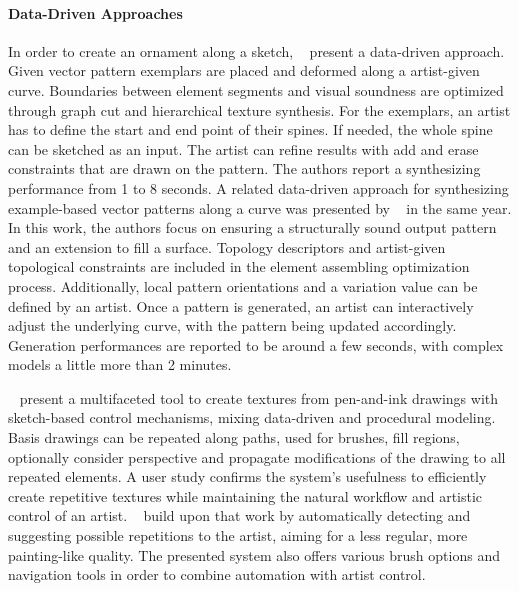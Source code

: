 
\paragraph{Data-Driven Approaches}

In order to create an ornament along a sketch, \citeauthor*{lu_2014_dds}~\cite{lu_2014_dds} present a data-driven approach. Given vector pattern exemplars are placed and deformed along a artist-given curve. Boundaries between element segments and visual soundness are optimized through graph cut and hierarchical texture synthesis. For the exemplars, an artist has to define the start and end point of their spines. If needed, the whole spine can be sketched as an input. The artist can refine results with add and erase constraints that are drawn on the pattern. The authors report a synthesizing performance from 1 to 8 seconds. A related data-driven approach for synthesizing example-based vector patterns along a curve was presented by \citeauthor*{zhou_2014_tsv}~\cite{zhou_2014_tsv} in the same year. In this work, the authors focus on ensuring a structurally sound output pattern and an extension to fill a surface. Topology descriptors and artist-given topological constraints are included in the element assembling optimization process. Additionally, local pattern orientations and a variation value can be defined by an artist. Once a pattern is generated, an artist can interactively adjust the underlying curve, with the pattern being updated accordingly. Generation performances are reported to be around a few seconds, with complex models a little more than 2 minutes.

\citeauthor*{kazi_2012_vit}~\cite{kazi_2012_vit} present a multifaceted tool to create textures from pen-and-ink drawings with sketch-based control mechanisms, mixing data-driven and procedural modeling. Basis drawings can be repeated along paths, used for brushes, fill regions, optionally consider perspective and propagate modifications of the drawing to all repeated elements. A user study confirms the system’s usefulness to efficiently create repetitive textures while maintaining the natural workflow and artistic control of an artist. \citeauthor*{xing_2014_apr}~\cite{xing_2014_apr} build upon that work by automatically detecting and suggesting possible repetitions to the artist, aiming for a less regular, more painting-like quality. The presented system also offers various brush options and navigation tools in order to combine automation with artist control.

